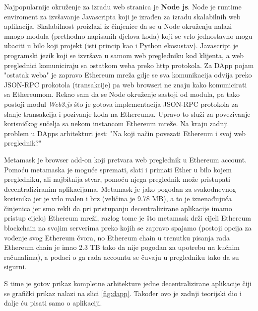 \documentclass[12pt]{report}
\begin{document}
Najpopularnije okruženje za izradu web stranica je \textbf{Node js}. Node je runtime enviroment za izvšavanje Javascripta koji je izrađen za izradu skalabilnih web aplikacija. Skalabilnost proizlazi iz činjenice da se u Node okruženju nalazi mnogo modula (prethodno napisanih djelova koda) koji se vrlo jednostavno mogu ubaciti u bilo koji projekt (isti princip kao i Python ekosustav). Javascript je programski jezik koji se izvršava u samom web pregledniku kod klijenta, a web preglednici komuniciraju sa ostatkom weba preko http protokola. Za DApp pojam "ostatak weba" je zapravo Ethereum mreža gdje se sva komunikacija odvija preko JSON-RPC prokotola (transakcije) pa web browseri ne znaju kako komunicirati sa Ethereumom. Rekao sam da se Node okruženje sastoji od modula, pa tako postoji modul \emph{Web3.js} što je gotova implementacija JSON-RPC protokola za slanje transakcija i pozivanje koda na Ethereumu. Upravo to služi za povezivanje korisničkog sučelja sa nekom instancom Ethereum mreže. Na kraju zadnji problem u DApps arhitekturi jest: "Na koji način povezati Ethereum i svoj web preglednik?"

Metamask je browser add-on koji pretvara web preglednik u Ethereum account. Pomoću metamaska je moguće spremati, slati i primati Ether u bilo kojem pregledniku, ali najbitnija stvar, pomoću njega preglednik može pristupati decentraliziranim aplikacijama. Metamask je jako pogodan za svakodnevnog korisnika jer je vrlo malen i brz (veličina je 9.78 MB), a to je iznenađujuća činjenica jer smo rekli da pri pristupanju decentralizirane aplikacije imamo pristup cijeloj Ethereum mreži, razlog tome je što metamask drži cijeli Ethereum blockchain na svojim serverima preko kojih se zapravo spajamo (postoji opcija za vođenje svog Ethereum čvora, no Ethereum chain u trenutku pisanja rada Ethereum chain je imao 2.3 TB tako da nije pogodan za upotrebu na kućnim računalima), a podaci o ga rada accountu se čuvaju u pregledniku tako da su sigurni.

S time je gotov prikaz kompletne arhitekture jedne decentralizirane aplikacije čiji se grafički prikaz nalazi na slici \ref{fig:dapp}. Također ovo je zadnji teorijski dio i dalje ću pisati samo o aplikaciji.
\end{document}
